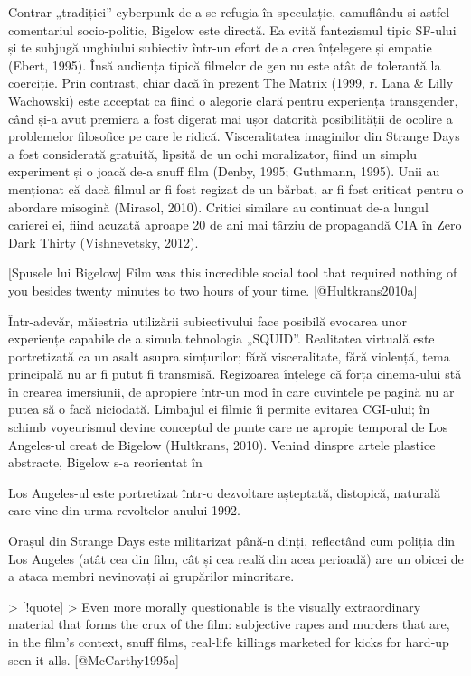 \documentclass[a4paper, 12pt]{article}
\begin{document}
Contrar „tradiției” cyberpunk de a se refugia în speculație, camuflându-și astfel comentariul socio-politic, Bigelow este directă. Ea evită fantezismul tipic SF-ului și te subjugă unghiului subiectiv într-un efort de a crea înțelegere și empatie (Ebert, 1995). Însă audiența tipică filmelor de gen nu este atât de tolerantă la coerciție. Prin contrast, chiar dacă în prezent The Matrix (1999, r. Lana & Lilly Wachowski) este acceptat ca fiind o alegorie clară pentru experiența transgender, când și-a avut premiera a fost digerat mai ușor datorită posibilității de ocolire a problemelor filosofice pe care le ridică. Visceralitatea imaginilor din Strange Days a fost considerată gratuită, lipsită de un ochi moralizator, fiind un simplu experiment și o joacă de-a snuff film (Denby, 1995; Guthmann, 1995). Unii au menționat că dacă filmul ar fi fost regizat de un bărbat, ar fi fost criticat pentru o abordare misogină (Mirasol, 2010). Critici similare au continuat de-a lungul carierei ei, fiind acuzată aproape 20 de ani mai târziu de propagandă CIA în Zero Dark Thirty (Vishnevetsky, 2012).\break

[Spusele lui Bigelow] Film was this incredible social tool that required nothing of you besides twenty minutes to two hours of your time. [@Hultkrans2010a]

Într-adevăr, măiestria utilizării subiectivului face posibilă evocarea unor experiențe capabile de a simula tehnologia „SQUID”. Realitatea virtuală este portretizată ca un asalt asupra simțurilor; fără visceralitate, fără violență, tema principală nu ar fi putut fi transmisă. Regizoarea înțelege că forța cinema-ului stă în crearea imersiunii, de apropiere într-un mod în care cuvintele pe pagină nu ar putea să o facă niciodată. Limbajul ei filmic îi permite evitarea CGI-ului; în schimb voyeurismul devine conceptul de punte care ne apropie temporal de Los Angeles-ul creat de Bigelow (Hultkrans, 2010). Venind dinspre artele plastice abstracte, Bigelow s-a reorientat în 

Los Angeles-ul este portretizat într-o dezvoltare așteptată, distopică, naturală care vine din urma revoltelor anului 1992. 

Orașul din Strange Days este militarizat până-n dinți, reflectând cum poliția din Los Angeles (atât cea din film, cât și cea reală din acea perioadă) are un obicei de a ataca membri nevinovați ai grupărilor minoritare.

> [!quote]
> Even more morally questionable is the visually extraordinary material that forms the crux of the film: subjective rapes and murders that are, in the film’s context, snuff films, real-life killings marketed for kicks for hard-up seen-it-alls. [@McCarthy1995a]
\end{document}
